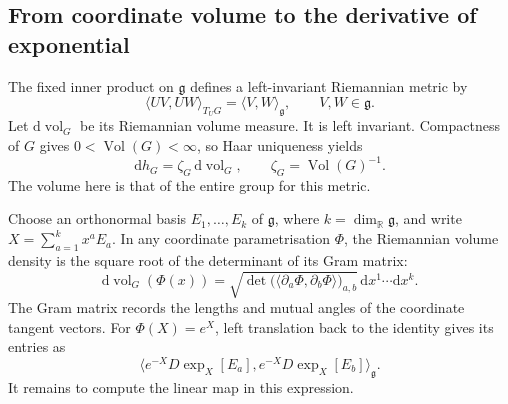 \documentclass[11pt,reqno]{amsart}
\numberwithin{equation}{section}
\theoremstyle{definition}
\theoremstyle{remark}
\newcommand{\R}{\mathbb R}
\newcommand{\dd}{\mathrm d}
\newcommand{\g}{\mathfrak g}
\DeclareMathOperator{\Vol}{Vol}
\begin{document}
\subsection{From coordinate volume to the derivative of exponential}

The fixed inner product on \(\g\) defines a left-invariant
Riemannian metric by
\[
           \langle UV,UW\rangle_{T_UG}=\langle V,W\rangle_{\g},
           \qquad V,W\in\g.
\]
Let \(\dd\operatorname{vol}_G\) be its Riemannian volume measure.
It is left invariant. Compactness of \(G\) gives
\(0<\Vol(G)<\infty\), so Haar uniqueness yields
\begin{equation}
     \dd h_G=\zeta_G\,\dd\operatorname{vol}_G,
     \qquad \zeta_G=\Vol(G)^{-1}.
 \label{eq:haar-volume}
\end{equation}
The volume here is that of the entire group for this metric.

Choose an orthonormal basis \(E_1,\ldots,E_k\) of \(\g\),
where \(k=\dim_{\R}\g\), and write
\(X=\sum_{a=1}^kx^aE_a\). In any coordinate parametrisation
\(\Phi\), the Riemannian volume density is the square root of
the determinant of its Gram matrix:
\begin{equation}
 \dd\operatorname{vol}_G(\Phi(x))
   =\sqrt{\det\bigl(\langle\partial_a\Phi,
                                 \partial_b\Phi\rangle\bigr)_{a,b}}
                                                 \,\dd x^1\cdots\dd x^k.
 \label{eq:coordinate-volume}
\end{equation}
The Gram matrix records the lengths and mutual angles of the
coordinate tangent vectors. For \(\Phi(X)=e^X\), left translation
back to the identity gives its entries as
\begin{equation}
   \big\langle e^{-X}D\exp_X[E_a],
                       e^{-X}D\exp_X[E_b]\big\rangle_{\g}.
 \label{eq:exponential-Gram}
\end{equation}
It remains to compute the linear map in this expression.
\end{document}
